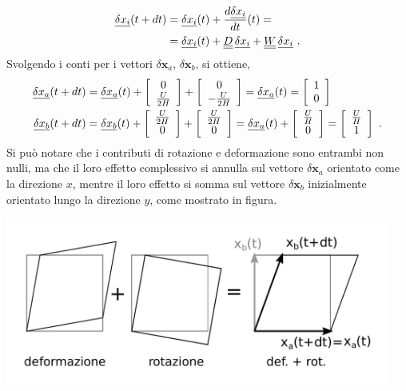 \begin{equation}
 \begin{aligned}
     \underline{\delta x_i}(t+dt) & = \underline{\delta x_i}(t) + \frac{d \underline{\delta x_i}}{ dt}(t) = \\
     & = \underline{\delta x_i}(t) + \underline{\underline{D}} \, \underline{\delta x_i} + 
                              \underline{\underline{W}} \, \underline{\delta x_i} \ .
 \end{aligned}
\end{equation}
Svolgendo i conti per i vettori $\delta \bm{x}_a$, $\delta \bm{x}_b$, si ottiene,
\begin{equation}
 \begin{aligned}
     \underline{\delta x_a}(t+dt) & = \underline{\delta x_a}(t) +
     \left[ \begin{array}{c} 0 \\  \frac{U}{2H} \end{array}  \right] +
     \left[ \begin{array}{c} 0 \\ -\frac{U}{2H} \end{array}  \right] =
     \underline{\delta x_a}(t) =
     \left[ \begin{array}{c} 1 \\ 0 \end{array}  \right]
         \\
     \underline{\delta x_b}(t+dt) & = \underline{\delta x_b}(t) +
     \left[ \begin{array}{c} \frac{U}{2H} \\ 0 \end{array}  \right] +
     \left[ \begin{array}{c} \frac{U}{2H} \\ 0 \end{array}  \right] = 
     \underline{\delta x_a}(t) + 
     \left[ \begin{array}{c} \frac{U}{H} \\ 0 \end{array}  \right] =
     \left[ \begin{array}{c} \frac{U}{H} \\ 1 \end{array}  \right] \ .
 \end{aligned}
\end{equation}
Si può notare che i contributi di rotazione e deformazione sono entrambi non nulli, ma che il loro effetto complessivo si annulla sul vettore $\delta \bm{x}_a$ orientato come la direzione $x$, mentre il loro effetto si somma sul vettore $\delta \bm{x}_b$ inizialmente orientato lungo la direzione $y$, come mostrato in figura.

\begin{center}
 \includegraphics[width=0.95\textwidth]{./rotdef}
\end{center}
